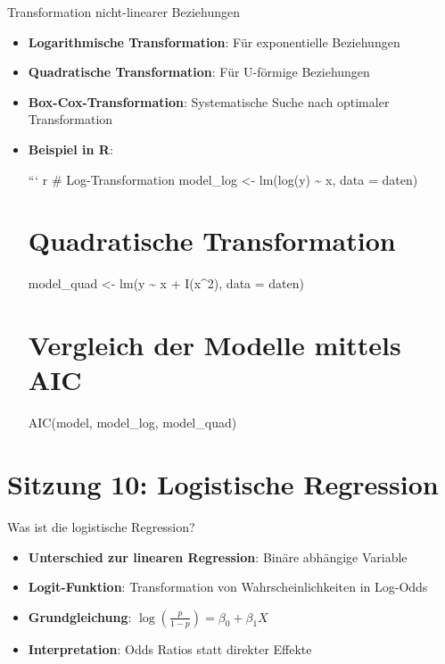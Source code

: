 \documentclass[
  ignorenonframetext,
]{beamer}
\providecommand{\tightlist}{%
  \setlength{\itemsep}{0pt}\setlength{\parskip}{0pt}}
\begin{document}
\begin{frame}{Transformation nicht-linearer Beziehungen}
\protect{}\label{transformation-nicht-linearer-beziehungen}
\begin{itemize}
\item
  \textbf{Logarithmische Transformation}: Für exponentielle Beziehungen
\item
  \textbf{Quadratische Transformation}: Für U-förmige Beziehungen
\item
  \textbf{Box-Cox-Transformation}: Systematische Suche nach optimaler
  Transformation
\item
  \textbf{Beispiel in R}:

  ``` r \# Log-Transformation model\_log \textless- lm(log(y)
  \textasciitilde{} x, data = daten)

  \section{Quadratische
  Transformation}\label{quadratische-transformation}

  model\_quad \textless- lm(y \textasciitilde{} x + I(x\^{}2), data =
  daten)

  \section{Vergleich der Modelle mittels
  AIC}\label{vergleich-der-modelle-mittels-aic}

  AIC(model, model\_log, model\_quad)
\end{itemize}
\end{frame}

\section{Sitzung 10: Logistische
Regression}\label{sitzung-10-logistische-regression}

\begin{frame}{Was ist die logistische Regression?}
\protect{}\label{was-ist-die-logistische-regression}
\begin{itemize}
\tightlist
\item
  \textbf{Unterschied zur linearen Regression}: Binäre abhängige
  Variable
\item
  \textbf{Logit-Funktion}: Transformation von Wahrscheinlichkeiten in
  Log-Odds
\item
  \textbf{Grundgleichung}:
  \(\log\left(\frac{p}{1-p}\right) = \beta_0 + \beta_1 X\)
\item
  \textbf{Interpretation}: Odds Ratios statt direkter Effekte
\end{itemize}
\end{frame}
\end{document}
